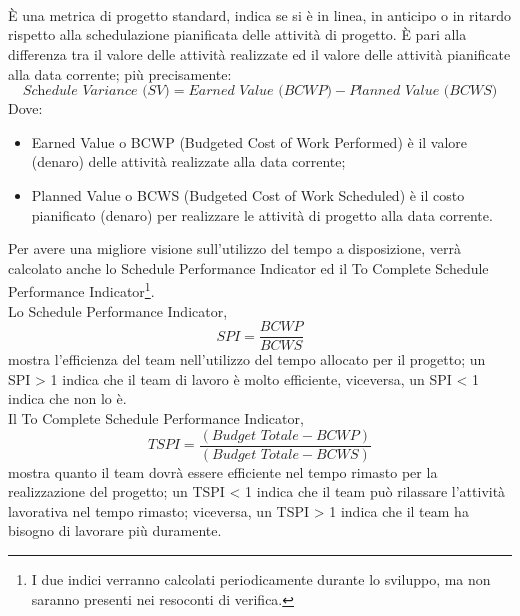 \documentclass[../NormeDiProgetto.tex]{subfiles}
\begin{document}
				\paragraph{\\}
					È una metrica di progetto standard, indica se si è in linea, in
					anticipo o in ritardo rispetto alla schedulazione pianificata delle
					attività di progetto. È pari alla differenza tra il valore delle
					attività realizzate ed il valore delle attività pianificate alla
					data corrente; più precisamente:
					\begin{equation*}
						\textit{Schedule Variance (SV)} = \textit{Earned Value (BCWP)} - \textit{Planned Value (BCWS)}
					\end{equation*}
					Dove:
					\begin{itemize}
						\item Earned Value o BCWP (Budgeted Cost of Work Performed) è il valore
						(denaro) delle attività realizzate alla data corrente;
						\item Planned Value o BCWS (Budgeted Cost of Work Scheduled) è il costo
						pianificato (denaro) per realizzare le attività di progetto alla
						data corrente.
					\end{itemize}
					Per avere una migliore visione sull'utilizzo del tempo a disposizione, verrà
					calcolato anche lo Schedule Performance Indicator ed il To Complete Schedule
					Performance Indicator\footnote{I due indici verranno calcolati periodicamente
						durante lo sviluppo, ma non saranno presenti nei resoconti di verifica.}.\\
					Lo Schedule Performance Indicator,
					\begin{equation*}
						\textit{SPI} = \frac{\textit{BCWP}}{\textit{BCWS}}
					\end{equation*}
					mostra l'efficienza del team nell'utilizzo del tempo allocato per il progetto;
					un SPI > 1 indica che il team di lavoro è molto efficiente,
					viceversa, un SPI < 1 indica che non lo è.\\
					Il To Complete Schedule Performance Indicator,
					\begin{equation*}
						\textit{TSPI} = \frac{( \textit{Budget Totale} - \textit{BCWP} )}{( \textit{Budget Totale} - \textit{BCWS} )}
					\end{equation*}
					mostra quanto il team dovrà essere efficiente nel tempo rimasto per la
					realizzazione del progetto; un TSPI < 1 indica che il team può rilassare
					l'attività lavorativa nel tempo rimasto; viceversa, un TSPI > 1 indica che il
					team ha bisogno di lavorare più duramente.
\end{document}
